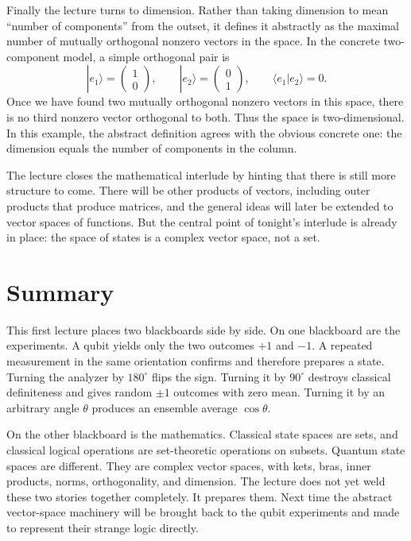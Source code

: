 Finally the lecture turns to dimension. Rather than taking dimension to mean ``number of components'' from the outset, it defines it abstractly as the maximal number of mutually orthogonal nonzero vectors in the space. In the concrete two-component model, a simple orthogonal pair is
\begin{equation}
|e_1\rangle=
\begin{pmatrix}
1\\
0
\end{pmatrix},
\qquad
|e_2\rangle=
\begin{pmatrix}
0\\
1
\end{pmatrix},
\qquad
\langle e_1|e_2\rangle=0.
\end{equation}
Once we have found two mutually orthogonal nonzero vectors in this space, there is no third nonzero vector orthogonal to both. Thus the space is two-dimensional. In this example, the abstract definition agrees with the obvious concrete one: the dimension equals the number of components in the column.

The lecture closes the mathematical interlude by hinting that there is still more structure to come. There will be other products of vectors, including outer products that produce matrices, and the general ideas will later be extended to vector spaces of functions. But the central point of tonight's interlude is already in place: the space of states is a complex vector space, not a set.

\section{Summary}

This first lecture places two blackboards side by side. On one blackboard are the experiments. A qubit yields only the two outcomes \(+1\) and \(-1\). A repeated measurement in the same orientation confirms and therefore prepares a state. Turning the analyzer by \(180^\circ\) flips the sign. Turning it by \(90^\circ\) destroys classical definiteness and gives random \(\pm1\) outcomes with zero mean. Turning it by an arbitrary angle \(\theta\) produces an ensemble average \(\cos\theta\).

On the other blackboard is the mathematics. Classical state spaces are sets, and classical logical operations are set-theoretic operations on subsets. Quantum state spaces are different. They are complex vector spaces, with kets, bras, inner products, norms, orthogonality, and dimension. The lecture does not yet weld these two stories together completely. It prepares them. Next time the abstract vector-space machinery will be brought back to the qubit experiments and made to represent their strange logic directly.
